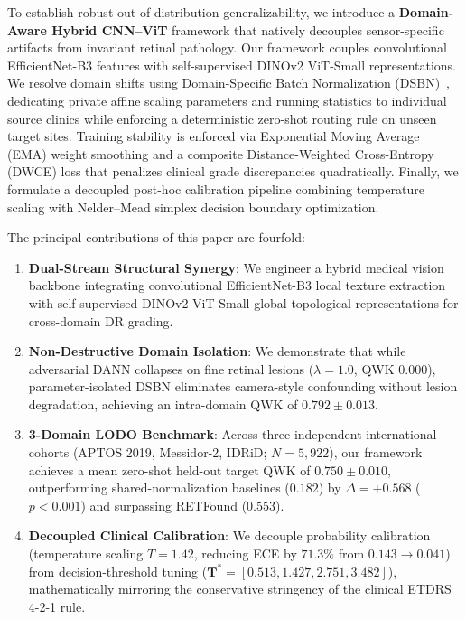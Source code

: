 \documentclass[conference]{IEEEtran}
\begin{document}
To establish robust out-of-distribution generalizability, we introduce a \textbf{Domain-Aware Hybrid CNN--ViT} framework that natively decouples sensor-specific artifacts from invariant retinal pathology. Our framework couples convolutional EfficientNet-B3 features with self-supervised DINOv2 ViT-Small representations. We resolve domain shifts using Domain-Specific Batch Normalization (DSBN)~\cite{chang2019domain}, dedicating private affine scaling parameters and running statistics to individual source clinics while enforcing a deterministic zero-shot routing rule on unseen target sites. Training stability is enforced via Exponential Moving Average (EMA) weight smoothing and a composite Distance-Weighted Cross-Entropy (DWCE) loss that penalizes clinical grade discrepancies quadratically. Finally, we formulate a decoupled post-hoc calibration pipeline combining temperature scaling with Nelder--Mead simplex decision boundary optimization.

The principal contributions of this paper are fourfold:
\begin{enumerate}
    \item \textbf{Dual-Stream Structural Synergy}: We engineer a hybrid medical vision backbone integrating convolutional EfficientNet-B3 local texture extraction with self-supervised DINOv2 ViT-Small global topological representations for cross-domain DR grading.
    \item \textbf{Non-Destructive Domain Isolation}: We demonstrate that while adversarial DANN collapses on fine retinal lesions ($\lambda=1.0$, QWK $0.000$), parameter-isolated DSBN eliminates camera-style confounding without lesion degradation, achieving an intra-domain QWK of $0.792 \pm 0.013$.
    \item \textbf{3-Domain LODO Benchmark}: Across three independent international cohorts (APTOS 2019, Messidor-2, IDRiD; $N=5,922$), our framework achieves a mean zero-shot held-out target QWK of $\mathbf{0.750 \pm 0.010}$, outperforming shared-normalization baselines ($0.182$) by $\Delta = +0.568$ ($p < 0.001$) and surpassing RETFound ($0.553$).
    \item \textbf{Decoupled Clinical Calibration}: We decouple probability calibration (temperature scaling $T=1.42$, reducing ECE by $71.3\%$ from $0.143 \rightarrow 0.041$) from decision-threshold tuning ($\mathbf{T}^* = [0.513, 1.427, 2.751, 3.482]$), mathematically mirroring the conservative stringency of the clinical ETDRS 4-2-1 rule.
\end{enumerate}
\end{document}
